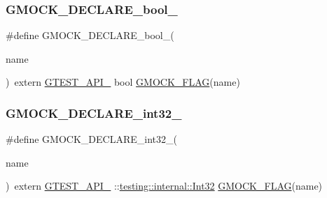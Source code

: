 \subsubsection{\texorpdfstring{GMOCK\_DECLARE\_bool\_}{GMOCK\_DECLARE\_bool\_}}
{\footnotesize\ttfamily \#define G\+M\+O\+C\+K\+\_\+\+D\+E\+C\+L\+A\+R\+E\+\_\+bool\+\_\+(\begin{DoxyParamCaption}\item[{}]{name }\end{DoxyParamCaption})~extern \mbox{\hyperlink{_obj__test_2lib_2googletest-release-1_88_81_2googletest_2include_2gtest_2internal_2gtest-port_8h_aa73be6f0ba4a7456180a94904ce17790}{G\+T\+E\+S\+T\+\_\+\+A\+P\+I\+\_\+}} bool \mbox{\hyperlink{_obj__test_2lib_2googletest-release-1_88_81_2googlemock_2include_2gmock_2internal_2gmock-port_8h_ad7119adfef06be5e7b1551633f5a1436}{G\+M\+O\+C\+K\+\_\+\+F\+L\+AG}}(name)}

\mbox{\label{_obj__test_2lib_2googletest-master_2googlemock_2include_2gmock_2internal_2gmock-port_8h_adeb7f0a8d842d1d541615763835af3f9}} 
\subsubsection{\texorpdfstring{GMOCK\_DECLARE\_int32\_}{GMOCK\_DECLARE\_int32\_}}
{\footnotesize\ttfamily \#define G\+M\+O\+C\+K\+\_\+\+D\+E\+C\+L\+A\+R\+E\+\_\+int32\+\_\+(\begin{DoxyParamCaption}\item[{}]{name }\end{DoxyParamCaption})~extern \mbox{\hyperlink{_obj__test_2lib_2googletest-release-1_88_81_2googletest_2include_2gtest_2internal_2gtest-port_8h_aa73be6f0ba4a7456180a94904ce17790}{G\+T\+E\+S\+T\+\_\+\+A\+P\+I\+\_\+}} \+::\mbox{\hyperlink{namespacetesting_1_1internal_af89e21e4043b5cf0c120af487b24fa06}{testing\+::internal\+::\+Int32}} \mbox{\hyperlink{_obj__test_2lib_2googletest-release-1_88_81_2googlemock_2include_2gmock_2internal_2gmock-port_8h_ad7119adfef06be5e7b1551633f5a1436}{G\+M\+O\+C\+K\+\_\+\+F\+L\+AG}}(name)}

\mbox{\label{_obj__test_2lib_2googletest-master_2googlemock_2include_2gmock_2internal_2gmock-port_8h_a35af08c45131cf68d78446cb8cfe40fe}} 
